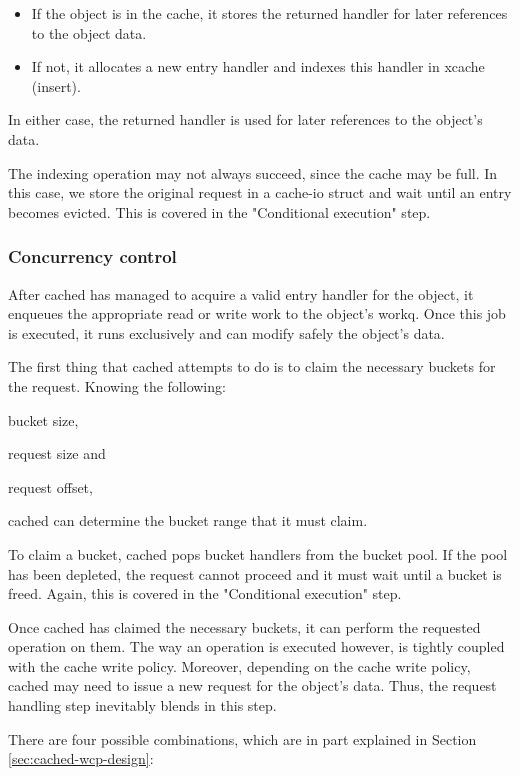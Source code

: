 \begin{itemize}
	\item If the object is in the cache, it stores the returned handler for 
		later references to the object data.
	\item If not, it allocates a new entry handler and indexes this handler 
		in xcache (insert).
\end{itemize}

In either case, the returned handler is used for later references to the 
object's data.

The indexing operation may not always succeed, since the cache may be full. In 
this case, we store the original request in a cache-io struct and wait until an 
entry becomes evicted. This is covered in the "Conditional execution" step.

\subsubsection{Concurrency control}

After cached has managed to acquire a valid entry handler for the object, it 
enqueues the appropriate read or write work to the object's workq.  Once this 
job is executed, it runs exclusively and can modify safely the object's data.

The first thing that cached attempts to do is to claim the necessary buckets 
for the request. Knowing the following:
\begin{inparaenum}[i)]
\item bucket size,
\item request size and
\item request offset,
\end{inparaenum}
cached can determine the bucket range that it must claim.

To claim a bucket, cached pops bucket handlers from the bucket pool. If the 
pool has been depleted, the request cannot proceed and it must wait until a
bucket is freed. Again, this is covered in the "Conditional execution" step.

Once cached has claimed the necessary buckets, it can perform the requested 
operation on them. The way an operation is executed however, is tightly coupled 
with the cache write policy. Moreover, depending on the cache write policy, 
cached may need to issue a new request for the object's data. Thus, the request 
handling step inevitably blends in this step.

There are four possible combinations, which are in part explained in Section 
\ref{sec:cached-wcp-design}:

